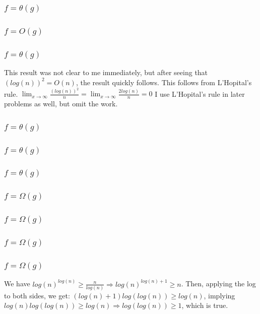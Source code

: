 \documentclass{article}
\begin{document}
\subsection{}
\subsubsection{$f = \theta(g)$}
\subsubsection{$f = O(g)$}
\subsubsection{$f = \theta(g)$}
This result was not clear to me immediately, but after seeing that $(log(n))^2 = O(n)$, the result quickly follows. This follows from L'Hopital's rule.  $\lim_{x\to\infty}\frac{(log(n))^2}{n}=\lim_{x\to\infty}\frac{2log(n)}{n}=0$
I use L'Hopital's rule in later problems as well, but omit the work. 
\subsubsection{$f = \theta(g)$}
\subsubsection{$f = \theta(g)$}
\subsubsection{$f = \theta(g)$}
\subsubsection{$f = \Omega(g)$}
\subsubsection{$f = \Omega(g)$}
\subsubsection{$f = \Omega(g)$}
\subsubsection{$f = \Omega(g)$}
We have $log(n)^{log(n)} \geq \frac{n}{log(n)} \Rightarrow log(n)^{log(n) + 1} \geq n$. Then, applying the log to both sides, we get: $(log(n) + 1)log(log(n)) \geq log(n)$, implying $log(n)log(log(n)) \geq log(n) \Rightarrow log(log(n)) \geq 1$, which is true. 
\end{document}
